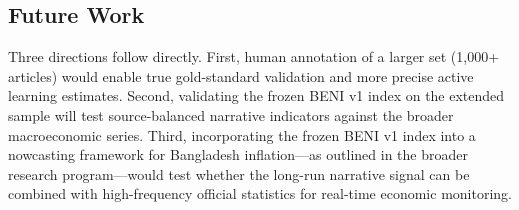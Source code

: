 \subsection{Future Work}

Three directions follow directly. First, human annotation of a larger set (1,000+ articles) would enable true gold-standard validation and more precise active learning estimates. Second, validating the frozen BENI v1 index on the extended sample will test source-balanced narrative indicators against the broader macroeconomic series. Third, incorporating the frozen BENI v1 index into a nowcasting framework for Bangladesh inflation---as outlined in the broader research program---would test whether the long-run narrative signal can be combined with high-frequency official statistics for real-time economic monitoring.
